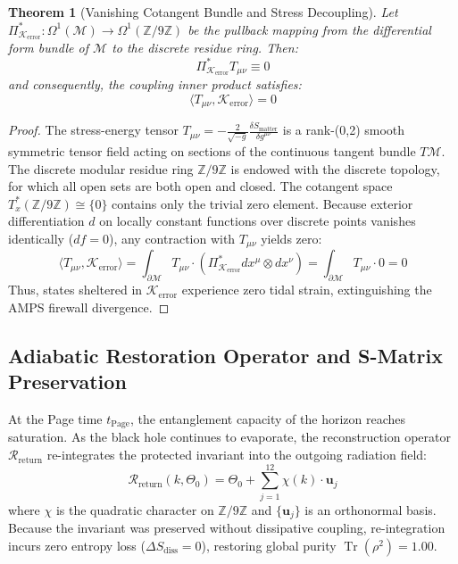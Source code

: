 \documentclass[11pt,a4paper]{article}
\newcommand{\Kerr}{\mathcal{K}_{\text{error}}}
\newtheorem{theorem}{Theorem}
\begin{document}
\begin{theorem}[Vanishing Cotangent Bundle and Stress Decoupling]
Let $\Pi_{\Kerr}^*: \Omega^1(\mathcal{M}) \to \Omega^1(\mathbb{Z}/9\mathbb{Z})$ be the pullback mapping from the differential form bundle of $\mathcal{M}$ to the discrete residue ring. Then:
\begin{equation}
\Pi_{\Kerr}^* T_{\mu\nu} \equiv 0
\end{equation}
and consequently, the coupling inner product satisfies:
\begin{equation}
\langle T_{\mu\nu}, \Kerr \rangle = 0
\end{equation}
\end{theorem}
\begin{proof}
The stress-energy tensor $T_{\mu\nu} = -\frac{2}{\sqrt{-g}}\frac{\delta S_{\text{matter}}}{\delta g^{\mu\nu}}$ is a rank-(0,2) smooth symmetric tensor field acting on sections of the continuous tangent bundle $T\mathcal{M}$. The discrete modular residue ring $\mathbb{Z}/9\mathbb{Z}$ is endowed with the discrete topology, for which all open sets are both open and closed. The cotangent space $T^*_x(\mathbb{Z}/9\mathbb{Z}) \cong \{0\}$ contains only the trivial zero element. Because exterior differentiation $d$ on locally constant functions over discrete points vanishes identically ($df = 0$), any contraction with $T_{\mu\nu}$ yields zero:
\begin{equation}
\langle T_{\mu\nu}, \Kerr \rangle = \int_{\partial \mathcal{M}} T_{\mu\nu} \cdot \left( \Pi_{\Kerr}^* dx^\mu \otimes dx^\nu \right) = \int_{\partial \mathcal{M}} T_{\mu\nu} \cdot 0 = 0
\end{equation}
Thus, states sheltered in $\Kerr$ experience zero tidal strain, extinguishing the AMPS firewall divergence.
\end{proof}

\subsection{Adiabatic Restoration Operator and S-Matrix Preservation}\label{sec:restoration}
At the Page time $t_{\text{Page}}$, the entanglement capacity of the horizon reaches saturation. As the black hole continues to evaporate, the reconstruction operator $\mathcal{R}_{\text{return}}$ re-integrates the protected invariant into the outgoing radiation field:
\begin{equation}
\mathcal{R}_{\text{return}}(k, \Theta_0) = \Theta_0 + \sum_{j=1}^{12} \chi(k) \cdot \mathbf{u}_j
\end{equation}
where $\chi$ is the quadratic character on $\mathbb{Z}/9\mathbb{Z}$ and $\{\mathbf{u}_j\}$ is an orthonormal basis. Because the invariant was preserved without dissipative coupling, re-integration incurs zero entropy loss ($\Delta S_{\text{diss}} = 0$), restoring global purity $\operatorname{Tr}(\rho^2) = 1.00$.
\end{document}
